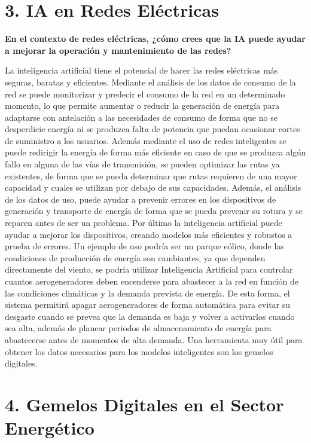 \documentclass[12pt,a4paper]{article}
\begin{document}
\section*{3. IA en Redes Eléctricas}

\textbf{En el contexto de redes eléctricas, ¿cómo crees que la IA puede ayudar a mejorar la operación y mantenimiento de las redes?}

La inteligencia artificial tiene el potencial de hacer las redes eléctricas más seguras, baratas y eficientes. Mediante el análisis de los datos de consumo de la red se puede monitorizar y predecir el consumo de la red en un determinado momento, lo que permite aumentar o reducir la generación de energía para adaptarse con antelación a las necesidades de consumo de forma que no se desperdicie energía ni se produzca falta de potencia que puedan ocasionar cortes de suministro a los usuarios. Además mediante el uso de redes inteligentes se puede redirigir la energía de forma más eficiente en caso de que se produzca algún fallo en alguna de las vías de  transmisión, se pueden optimizar las rutas ya existentes, de forma que se pueda determinar que rutas requieren de una mayor capacidad y cuales se utilizan por debajo de sus capacidades. Además, el análisis de los datos de uso, puede ayudar a prevenir errores en los dispositivos de generación y transporte de energía de forma que se pueda prevenir su rotura y se reparen antes de ser un problema. Por último la inteligencia artificial puede ayudar a mejorar los dispositivos, creando modelos más eficientes y robustos a prueba de errores. Un ejemplo de uso podría ser un parque eólico, donde las condiciones de producción de energía son cambiantes, ya que dependen directamente del viento, se podría utilizar Inteligencia Artificial para controlar cuantos aerogeneradores deben encenderse para abastecer a la red en función de las condiciones climáticas y la demanda prevista de energía. De esta forma, el sistema permitirá apagar aerogeneradores de forma automática para evitar su desgaste cuando se prevea que la demanda es baja y volver a activarlos cuando sea alta, además de planear periodos de almacenamiento de energía para abastecerse antes de momentos de alta demanda. Una herramienta muy útil para obtener los datos necesarios para los modelos inteligentes son los gemelos digitales.

\section*{4. Gemelos Digitales en el Sector Energético}
\end{document}
